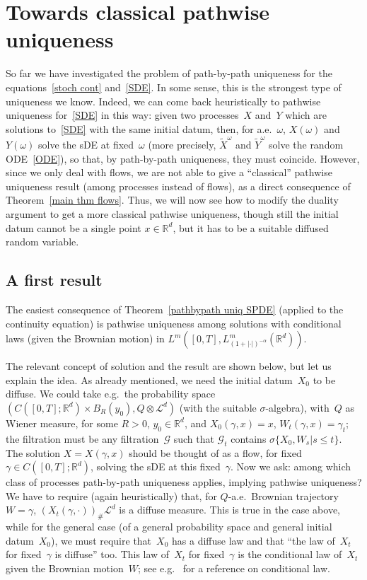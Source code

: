 \documentclass[a4paper,10pt]{article}
\newcommand\1{\mathbbm{1}}
\newcommand{\mr}{\mathbb{R}}
\newcommand{\mc}{\mathcal}
\newcommand{\td}{\tilde}
\numberwithin{equation}{section}
\begin{document}
\section{Towards classical pathwise uniqueness}

So far we have investigated the problem of path-by-path uniqueness for the equations~\eqref{stoch cont} and~\eqref{SDE}. In some sense, this is the strongest type of uniqueness we know. Indeed, we can come back heuristically to pathwise uniqueness for~\eqref{SDE} in this way: given two processes~$X$ and~$Y$ which are solutions to~\eqref{SDE} with the same initial datum, then, for a.e.~$\omega$, $X(\omega)$ and $Y(\omega)$ solve the sDE at fixed~$\omega$ (more precisely, $\td{X}^\omega$ and $\td{Y}^\omega$ solve the random ODE~\eqref{ODE}), so that, by path-by-path uniqueness, they must coincide. However, since we only deal with flows, we are not able to give a ``classical'' pathwise uniqueness result (among processes instead of flows), as a direct consequence of Theorem~\ref{main thm flows}. Thus, we will now see how to modify the duality argument to get a more classical pathwise uniqueness, though still the initial datum cannot be a single point $x \in \mr^d$, but it has to be a suitable diffused random variable.

\subsection{A first result}\label{firstpathwise}

The easiest consequence of Theorem~\ref{pathbypath uniq SPDE} (applied to the continuity equation) is pathwise uniqueness among solutions with conditional laws (given the Brownian motion) in $L^m([0,T],L^m_{(1+|\cdot|)^{-\alpha}}(\mr^d))$.

The relevant concept of solution and the result are shown below, but let us explain the idea. As already mentioned, we need the initial datum~$X_0$ to be diffuse. We could take e.g.~the probability space $(C([0,T];\mr^d)\times B_R(y_0),Q\otimes\mc{L}^d)$ (with the suitable $\sigma$-algebra), with~$Q$ as Wiener measure, for some $R>0$, $y_0 \in \mr^d$, and $X_0(\gamma,x)=x$, $W_t(\gamma,x)=\gamma_t$; the filtration must be any filtration~$\mc{G}$ such that $\mc{G}_t$ contains $\sigma\{X_0,W_s|s\le t\}$. The solution $X=X(\gamma,x)$ should be thought of as a flow, for fixed~$\gamma \in C([0,T];\mr^d)$, solving the sDE at this fixed~$\gamma$. Now we ask: among which class of processes path-by-path uniqueness applies, implying pathwise uniqueness? We have to require (again heuristically) that, for $Q$-a.e.~Brownian trajectory $W=\gamma$, $(X_t(\gamma,\cdot))_\#\mc{L}^d$ is a diffuse measure. This is true in the case above, while for the general case (of a general probability space and general initial datum~$X_0$), we must require that~$X_0$ has a diffuse law and that ``the law of~$X_t$ for fixed~$\gamma$ is diffuse'' too. This law of~$X_t$ for fixed~$\gamma$ is the conditional law of~$X_t$ given the Brownian motion~$W$; see e.g.~\cite[Chapter~1]{StrVar} for a reference on conditional law.
\end{document}
